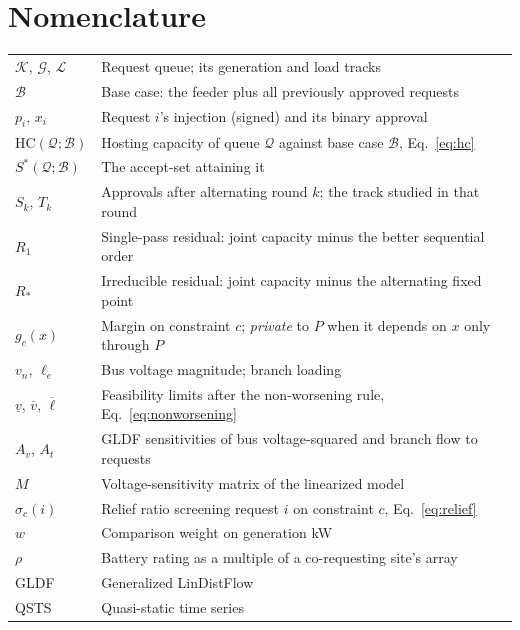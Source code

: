 \documentclass[review,authoryear,12pt]{elsarticle}
\begin{document}
\section*{Nomenclature}
\begin{small}
\noindent\begin{tabularx}{\linewidth}{@{}lX@{}}
$\mathcal{K}$, $\mathcal{G}$, $\mathcal{L}$ & Request queue; its generation and load tracks \\
$\mathcal{B}$ & Base case: the feeder plus all previously approved requests \\
$p_i$, $x_i$ & Request $i$'s injection (signed) and its binary approval \\
$\mathrm{HC}(\mathcal{Q};\mathcal{B})$ & Hosting capacity of queue $\mathcal{Q}$ against base case $\mathcal{B}$, Eq.~\eqref{eq:hc} \\
$S^{\ast}(\mathcal{Q};\mathcal{B})$ & The accept-set attaining it \\
$S_k$, $T_k$ & Approvals after alternating round $k$; the track studied in that round \\
$R_{1}$ & Single-pass residual: joint capacity minus the better sequential order \\
$R_{\ast}$ & Irreducible residual: joint capacity minus the alternating fixed point \\
$g_c(x)$ & Margin on constraint $c$; \emph{private} to $P$ when it depends on $x$ only through $P$ \\
$v_n$, $\ell_e$ & Bus voltage magnitude; branch loading \\
$\underline{v}$, $\overline{v}$, $\overline{\ell}$ & Feasibility limits after the non-worsening rule, Eq.~\eqref{eq:nonworsening} \\
$A_v$, $A_t$ & GLDF sensitivities of bus voltage-squared and branch flow to requests \\
$M$ & Voltage-sensitivity matrix of the linearized model \\
$\sigma_c(i)$ & Relief ratio screening request $i$ on constraint $c$, Eq.~\eqref{eq:relief} \\
$w$ & Comparison weight on generation kW \\
$\rho$ & Battery rating as a multiple of a co-requesting site's array \\
GLDF & Generalized LinDistFlow \\
QSTS & Quasi-static time series \\
\end{tabularx}
\end{small}
\end{document}
